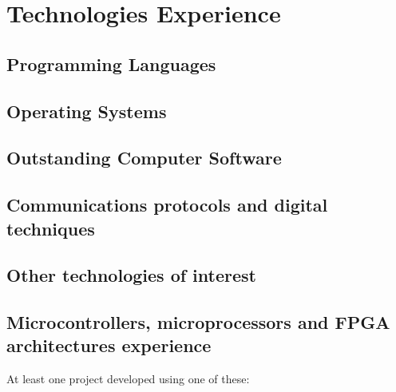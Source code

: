
\section{Technologies Experience}
   \subsection{Programming Languages}
   \cvitem { \dicadvanced }{\proglangadvanced }
   \cvitem { \dicmedium   }{\proglangmedium }  
   \cvitem { \dicbasic    }{\proglangbasic}    

   \subsection{Operating Systems}
      \cvitem { \dicadvanced } { \osadvanced }
      \cvitem { \dicmedium   } { \osmedium   }
      \cvitem { \dicbasic    } { \osbasic    }
   \subsection{Outstanding Computer Software}
      \cvitem { \dicadvanced } { \computerprogadvanced }
      \cvitem { \dicmedium   } { \computerprogmedium   }
      \cvitem { \dicbasic    } { \computerprogbasic    }

   \subsection{Communications protocols and digital techniques}
      \cvitem{\dicadvanced }{ \protocoladvanced }
      \cvitem{\dicmedium   }{ \protocolmedium   }
      \cvitem{\dicbasic    }{ \protocolbasic    }

   \subsection{Other technologies of interest}
      \cvitem{\dicadvanced} { \othertechadvanced }
      \cvitem{\dicmedium  } { \othertechmedium   }
      \cvitem{\dicbasic   } { \othertechbasic    }


   \subsection{Microcontrollers, microprocessors and FPGA architectures experience}
      \cvitem {} { At least one project developed using one of these:}

